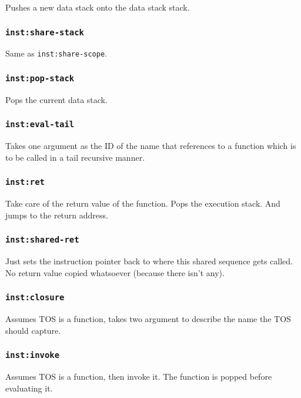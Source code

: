 \documentclass{article}
\newcommand{\inst}[1] {\texttt{inst:#1}}
\begin{document}
Pushes a new data stack onto the data stack stack.

\subsubsection{\inst{share-stack}}

Same as \inst{share-scope}.

\subsubsection{\inst{pop-stack}}

Pops the current data stack.

\subsubsection{\inst{eval-tail}}

Takes one argument as the ID of the name that references to a function which is to be called in a tail recursive manner.

\subsubsection{\inst{ret}}

Take care of the return value of the function. Pops the execution stack. And jumps to the return address.

\subsubsection{\inst{shared-ret}}

Just sets the instruction pointer back to where this shared sequence gets called. No return value copied whatsoever (because there isn't any).

\subsubsection{\inst{closure}}

Assumes TOS is a function, takes two argument to describe the name the TOS should capture.

\subsubsection{\inst{invoke}}

Assumes TOS is a function, then invoke it. The function is popped before evaluating it.
\end{document}
